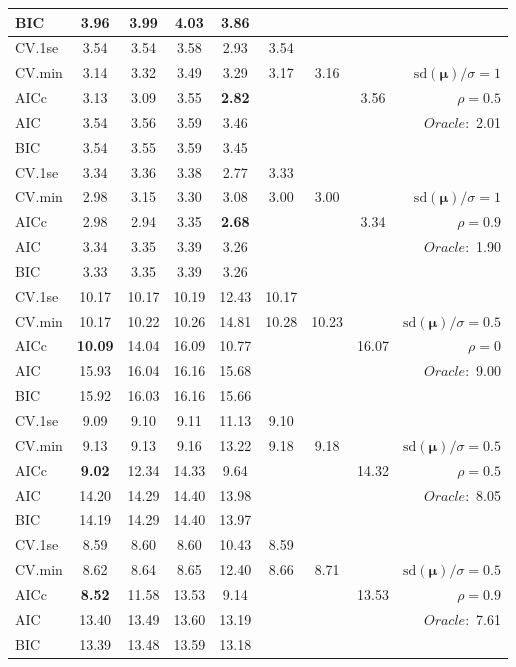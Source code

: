 \begin{table}
\begin{center}
\begin{tabular}{l*{7}{c}|r}
BIC & 3.96 & 3.99 & 4.03 & 3.86 & & & &  \\
 \hline 
CV.1se & 3.54 & 3.54 & 3.58 & 2.93 & 3.54 & & & \\
CV.min & 3.14 & 3.32 & 3.49 & 3.29 & 3.17 & 3.16 & & $\mathrm{sd}(\mathbf{\mu})/\sigma=1$ \\
AICc & 3.13 & 3.09 & 3.55 & {\bf 2.82} & & & 3.56 &  $\rho=0.5$ \\
AIC & 3.54 & 3.56 & 3.59 & 3.46 & & & &  \multirow{2}{*}{$Oracle: $ 2.01} \\
BIC & 3.54 & 3.55 & 3.59 & 3.45 & & & &  \\
 \hline 
CV.1se & 3.34 & 3.36 & 3.38 & 2.77 & 3.33 & & & \\
CV.min & 2.98 & 3.15 & 3.30 & 3.08 & 3.00 & 3.00 & & $\mathrm{sd}(\mathbf{\mu})/\sigma=1$ \\
AICc & 2.98 & 2.94 & 3.35 & {\bf 2.68} & & & 3.34 &  $\rho=0.9$ \\
AIC & 3.34 & 3.35 & 3.39 & 3.26 & & & &  \multirow{2}{*}{$Oracle: $ 1.90} \\
BIC & 3.33 & 3.35 & 3.39 & 3.26 & & & &  \\
 \hline 
CV.1se & 10.17 & 10.17 & 10.19 & 12.43 & 10.17 & & & \\
CV.min & 10.17 & 10.22 & 10.26 & 14.81 & 10.28 & 10.23 & & $\mathrm{sd}(\mathbf{\mu})/\sigma=0.5$ \\
AICc & {\bf 10.09} & 14.04 & 16.09 & 10.77 & & & 16.07 &  $\rho=0$ \\
AIC & 15.93 & 16.04 & 16.16 & 15.68 & & & &  \multirow{2}{*}{$Oracle: $ 9.00} \\
BIC & 15.92 & 16.03 & 16.16 & 15.66 & & & &  \\
 \hline 
CV.1se & 9.09 & 9.10 & 9.11 & 11.13 & 9.10 & & & \\
CV.min & 9.13 & 9.13 & 9.16 & 13.22 & 9.18 & 9.18 & & $\mathrm{sd}(\mathbf{\mu})/\sigma=0.5$ \\
AICc & {\bf 9.02} & 12.34 & 14.33 & 9.64 & & & 14.32 &  $\rho=0.5$ \\
AIC & 14.20 & 14.29 & 14.40 & 13.98 & & & &  \multirow{2}{*}{$Oracle: $ 8.05} \\
BIC & 14.19 & 14.29 & 14.40 & 13.97 & & & &  \\
 \hline 
CV.1se & 8.59 & 8.60 & 8.60 & 10.43 & 8.59 & & & \\
CV.min & 8.62 & 8.64 & 8.65 & 12.40 & 8.66 & 8.71 & & $\mathrm{sd}(\mathbf{\mu})/\sigma=0.5$ \\
AICc & {\bf 8.52} & 11.58 & 13.53 & 9.14 & & & 13.53 &  $\rho=0.9$ \\
AIC & 13.40 & 13.49 & 13.60 & 13.19 & & & &  \multirow{2}{*}{$Oracle: $ 7.61} \\
BIC & 13.39 & 13.48 & 13.59 & 13.18 & & & &  \\
 \hline 
\end{tabular}
\end{center}
\vspace{-1cm}
\end{table}




